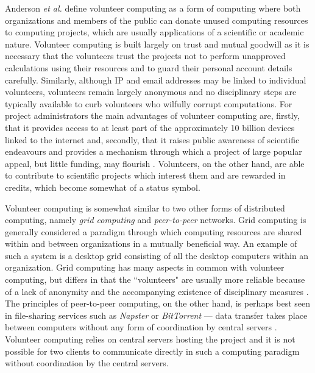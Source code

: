 Anderson \emph{et al.} \cite{boincwiki} define volunteer computing as a form of computing where both organizations and members of the public can donate unused computing resources to computing projects, which are usually applications of a scientific or academic nature. Volunteer computing is built largely on trust and mutual goodwill as it is necessary that the volunteers trust the projects not to perform unapproved calculations using their resources and to guard their personal account details carefully. Similarly, although IP and email addresses may be linked to individual volunteers, volunteers remain largely anonymous and no disciplinary steps are typically available to curb   volunteers who wilfully corrupt computations. For project administrators the main advantages of volunteer computing are, firstly, that it provides access to at least part of the approximately 10 billion devices linked to the internet \cite{anderson2013,cisco} and, secondly, that it raises public awareness of scientific endeavours and provides a mechanism through which a project of large popular appeal, but little funding, may flourish \cite{boincwiki}. Volunteers, on the other hand, are able to contribute to scientific projects which interest them and are rewarded in credits, which become somewhat of a status symbol.

Volunteer computing is somewhat similar to two other forms of distributed computing, namely \emph{grid computing} and \emph{peer-to-peer} networks. Grid computing is generally considered a paradigm through which computing resources are shared within and between organizations in a mutually beneficial way. An example of such a system is a   desktop grid consisting of  all the desktop computers within an organization. Grid computing has many aspects in common with volunteer computing, but differs in that the ``volunteers" are usually more reliable because of a lack of anonymity and the accompanying existence of disciplinary measures \cite{fostergrid,boincwiki}. The principles of peer-to-peer computing, on the other hand, is  perhaps best seen in file-sharing services such as \emph{Napster} \cite{napster} or \emph{BitTorrent}   \cite{bittorrent} --- data transfer takes place between computers without any form of coordination by central servers \cite{peer, peer2}. Volunteer computing relies on central servers hosting the project and it is not possible for two clients to communicate directly in such a computing paradigm without coordination by the central servers.  

